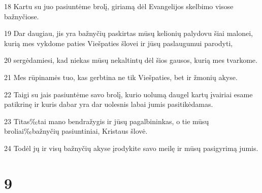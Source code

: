 \par 18 Kartu su juo pasiuntėme brolį, giriamą dėl Evangelijos skelbimo visose bažnyčiose. 
\par 19 Dar daugiau, jis yra bažnyčių paskirtas mūsų kelionių palydovu šiai malonei, kurią mes vykdome paties Viešpaties šlovei ir jūsų paslaugumui parodyti, 
\par 20 sergėdamiesi, kad niekas mūsų nekaltintų dėl šios gausos, kurią mes tvarkome. 
\par 21 Mes rūpinamės tuo, kas gerbtina ne tik Viešpaties, bet ir žmonių akyse. 
\par 22 Taigi su jais pasiuntėme savo brolį, kurio uolumą daugel kartų įvairiai esame patikrinę ir kuris dabar yra dar uolesnis labai jumis pasitikėdamas. 
\par 23 Titas‰tai mano bendražygis ir jūsų pagalbininkas, o tie mūsų broliai‰bažnyčių pasiuntiniai, Kristaus šlovė. 
\par 24 Todėl jų ir visų bažnyčių akyse įrodykite savo meilę ir mūsų pasigyrimą jumis.


\chapter{9}


